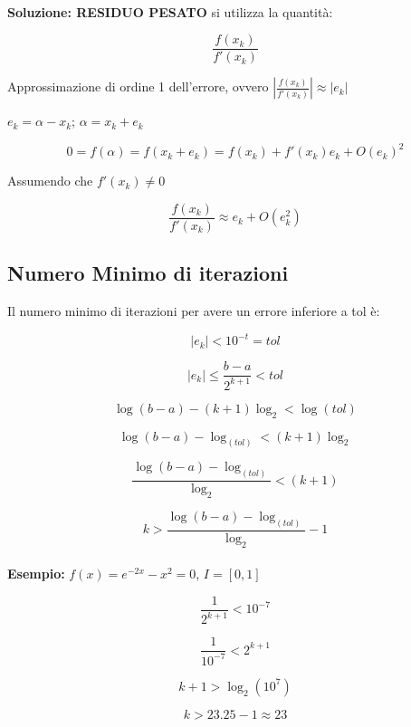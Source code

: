 \documentclass[a4paper, 11pt]{article}
\begin{document}
        \paragraph{}
        \textbf{Soluzione: RESIDUO PESATO }
        si utilizza la quantità:

        \[
            \frac{f(x_k)}{f'(x_k)}
        \]
        
        Approssimazione di ordine 1 dell'errore, ovvero $|\frac{f(x_k)}{f'(x_k)}| \approx |e_k|$


        $e_k = \alpha - x_k$; \quad $\alpha = x_k + e_k$
        

        \[
            0 = f(\alpha) = f(x_k + e_k) = f(x_k) + f'(x_k)e_k +O(e_k)^2
        \]

        Assumendo che $f'(x_k) \ne 0$
        
        \[
            \frac{f(x_k)}{f'(x_k)} \approx e_k + O(e_k^2)
        \]


        \subsection{Numero Minimo di iterazioni}
        Il numero minimo di iterazioni per avere un errore inferiore a tol è:

        \[
            |e_k| < 10^{-t} = tol
        \]

        \[
            |e_k| \le \frac{b-a}{2^{k+1}} < tol   
        \]

        \[
            \log(b-a) - (k+1)\log_2 < \log(tol)
        \]

        \[
            \log(b-a) - \log_(tol) < (k+1)\log_2
        \]

        \[
            \frac{\log(b-a)-\log_(tol)}{\log_2} < (k+1)
        \]

        \[
            k > \frac{\log(b-a)-\log_(tol)}{\log_2} -1
        \]
    

        \paragraph{}
        \textbf{Esempio:} $f(x) = e^{-2x}-x^2 = 0$, $I = [0,1]$
        
        \[
            \frac{1}{2^{k+1}} < 10^{-7}
        \]

        \[
            \frac{1}{10^{-7}} < 2^{k+1}
        \]

        \[
            k+1 > \log_2(10^7)
        \]

        \[
            k > 23.25 -1 \approx 23
        \]
\end{document}
